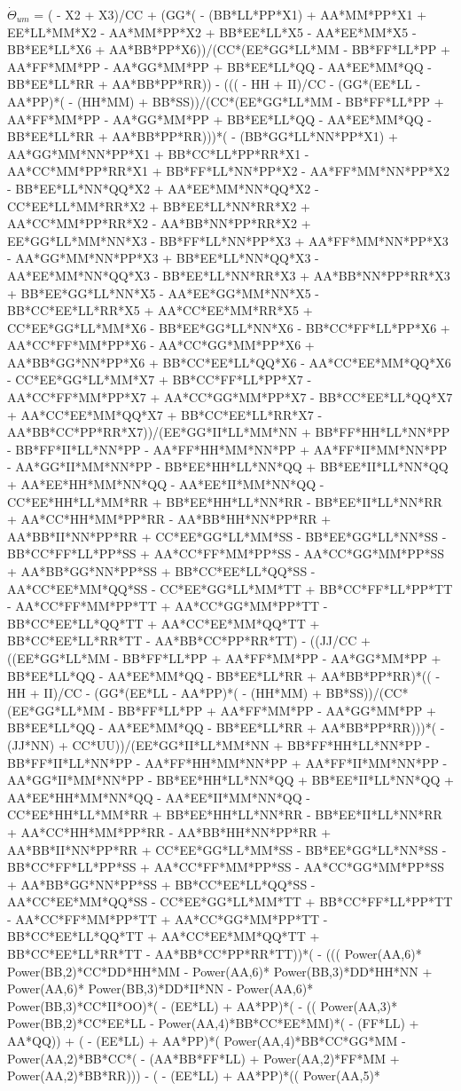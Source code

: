\documentclass[10pt]{article} %
\begin{document}
$\dot{\Theta}_{um}$ =
{\tiny
  ( - X2 + X3)/CC + (GG*( - (BB*LL*PP*X1) + AA*MM*PP*X1 + EE*LL*MM*X2 - AA*MM*PP*X2 + BB*EE*LL*X5 - AA*EE*MM*X5 - BB*EE*LL*X6 + AA*BB*PP*X6))/(CC*(EE*GG*LL*MM - BB*FF*LL*PP + AA*FF*MM*PP - AA*GG*MM*PP + BB*EE*LL*QQ - AA*EE*MM*QQ - BB*EE*LL*RR + AA*BB*PP*RR)) - ((( - HH + II)/CC - (GG*(EE*LL - AA*PP)*( - (HH*MM) + BB*SS))/(CC*(EE*GG*LL*MM - BB*FF*LL*PP + AA*FF*MM*PP - AA*GG*MM*PP + BB*EE*LL*QQ - AA*EE*MM*QQ - BB*EE*LL*RR + AA*BB*PP*RR)))*( - (BB*GG*LL*NN*PP*X1) + AA*GG*MM*NN*PP*X1 + BB*CC*LL*PP*RR*X1 - AA*CC*MM*PP*RR*X1 + BB*FF*LL*NN*PP*X2 - AA*FF*MM*NN*PP*X2 - BB*EE*LL*NN*QQ*X2 + AA*EE*MM*NN*QQ*X2 - CC*EE*LL*MM*RR*X2 + BB*EE*LL*NN*RR*X2 + AA*CC*MM*PP*RR*X2 - AA*BB*NN*PP*RR*X2 + EE*GG*LL*MM*NN*X3 - BB*FF*LL*NN*PP*X3 + AA*FF*MM*NN*PP*X3 - AA*GG*MM*NN*PP*X3 + BB*EE*LL*NN*QQ*X3 - AA*EE*MM*NN*QQ*X3 - BB*EE*LL*NN*RR*X3 + AA*BB*NN*PP*RR*X3 + BB*EE*GG*LL*NN*X5 - AA*EE*GG*MM*NN*X5 - BB*CC*EE*LL*RR*X5 + AA*CC*EE*MM*RR*X5 + CC*EE*GG*LL*MM*X6 - BB*EE*GG*LL*NN*X6 - BB*CC*FF*LL*PP*X6 + AA*CC*FF*MM*PP*X6 - AA*CC*GG*MM*PP*X6 + AA*BB*GG*NN*PP*X6 + BB*CC*EE*LL*QQ*X6 - AA*CC*EE*MM*QQ*X6 - CC*EE*GG*LL*MM*X7 + BB*CC*FF*LL*PP*X7 - AA*CC*FF*MM*PP*X7 + AA*CC*GG*MM*PP*X7 - BB*CC*EE*LL*QQ*X7 + AA*CC*EE*MM*QQ*X7 + BB*CC*EE*LL*RR*X7 - AA*BB*CC*PP*RR*X7))/(EE*GG*II*LL*MM*NN + BB*FF*HH*LL*NN*PP - BB*FF*II*LL*NN*PP - AA*FF*HH*MM*NN*PP + AA*FF*II*MM*NN*PP - AA*GG*II*MM*NN*PP - BB*EE*HH*LL*NN*QQ + BB*EE*II*LL*NN*QQ + AA*EE*HH*MM*NN*QQ - AA*EE*II*MM*NN*QQ - CC*EE*HH*LL*MM*RR + BB*EE*HH*LL*NN*RR - BB*EE*II*LL*NN*RR + AA*CC*HH*MM*PP*RR - AA*BB*HH*NN*PP*RR + AA*BB*II*NN*PP*RR + CC*EE*GG*LL*MM*SS - BB*EE*GG*LL*NN*SS - BB*CC*FF*LL*PP*SS + AA*CC*FF*MM*PP*SS - AA*CC*GG*MM*PP*SS + AA*BB*GG*NN*PP*SS + BB*CC*EE*LL*QQ*SS - AA*CC*EE*MM*QQ*SS - CC*EE*GG*LL*MM*TT + BB*CC*FF*LL*PP*TT - AA*CC*FF*MM*PP*TT + AA*CC*GG*MM*PP*TT - BB*CC*EE*LL*QQ*TT + AA*CC*EE*MM*QQ*TT + BB*CC*EE*LL*RR*TT - AA*BB*CC*PP*RR*TT) - ((JJ/CC + ((EE*GG*LL*MM - BB*FF*LL*PP + AA*FF*MM*PP - AA*GG*MM*PP + BB*EE*LL*QQ - AA*EE*MM*QQ - BB*EE*LL*RR + AA*BB*PP*RR)*(( - HH + II)/CC - (GG*(EE*LL - AA*PP)*( - (HH*MM) + BB*SS))/(CC*(EE*GG*LL*MM - BB*FF*LL*PP + AA*FF*MM*PP - AA*GG*MM*PP + BB*EE*LL*QQ - AA*EE*MM*QQ - BB*EE*LL*RR + AA*BB*PP*RR)))*( - (JJ*NN) + CC*UU))/(EE*GG*II*LL*MM*NN + BB*FF*HH*LL*NN*PP - BB*FF*II*LL*NN*PP - AA*FF*HH*MM*NN*PP + AA*FF*II*MM*NN*PP - AA*GG*II*MM*NN*PP - BB*EE*HH*LL*NN*QQ + BB*EE*II*LL*NN*QQ + AA*EE*HH*MM*NN*QQ - AA*EE*II*MM*NN*QQ - CC*EE*HH*LL*MM*RR + BB*EE*HH*LL*NN*RR - BB*EE*II*LL*NN*RR + AA*CC*HH*MM*PP*RR - AA*BB*HH*NN*PP*RR + AA*BB*II*NN*PP*RR + CC*EE*GG*LL*MM*SS - BB*EE*GG*LL*NN*SS - BB*CC*FF*LL*PP*SS + AA*CC*FF*MM*PP*SS - AA*CC*GG*MM*PP*SS + AA*BB*GG*NN*PP*SS + BB*CC*EE*LL*QQ*SS - AA*CC*EE*MM*QQ*SS - CC*EE*GG*LL*MM*TT + BB*CC*FF*LL*PP*TT - AA*CC*FF*MM*PP*TT + AA*CC*GG*MM*PP*TT - BB*CC*EE*LL*QQ*TT + AA*CC*EE*MM*QQ*TT + BB*CC*EE*LL*RR*TT - AA*BB*CC*PP*RR*TT))*( - ((( Power(AA,6)* Power(BB,2)*CC*DD*HH*MM -  Power(AA,6)* Power(BB,3)*DD*HH*NN +  Power(AA,6)* Power(BB,3)*DD*II*NN -  Power(AA,6)* Power(BB,3)*CC*II*OO)*( - (EE*LL) + AA*PP)*( - (( Power(AA,3)* Power(BB,2)*CC*EE*LL -  Power(AA,4)*BB*CC*EE*MM)*( - (FF*LL) + AA*QQ)) + ( - (EE*LL) + AA*PP)*( Power(AA,4)*BB*CC*GG*MM -  Power(AA,2)*BB*CC*( - (AA*BB*FF*LL) +  Power(AA,2)*FF*MM +  Power(AA,2)*BB*RR))) - ( - (EE*LL) + AA*PP)*(( Power(AA,5)* }
\end{document}
